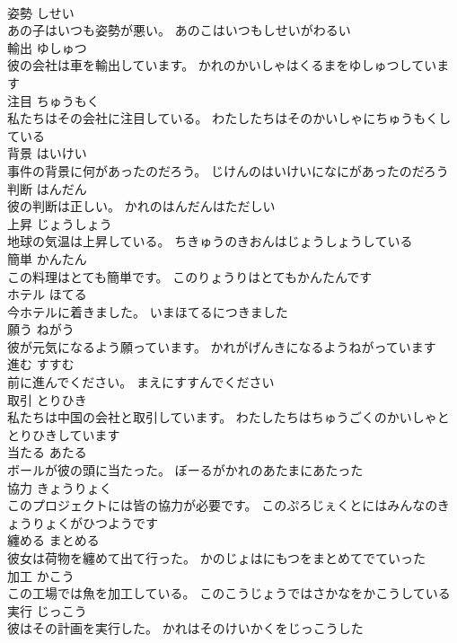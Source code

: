 \documentclass[8pt]{extreport}
\begin{document}
\begin{CJK}{UTF8}{min}
\\	姿勢	しせい	
\\	あの子はいつも姿勢が悪い。	あのこはいつもしせいがわるい	
\\	輸出	ゆしゅつ	
\\	彼の会社は車を輸出しています。	かれのかいしゃはくるまをゆしゅつしています	
\\	注目	ちゅうもく	
\\	私たちはその会社に注目している。	わたしたちはそのかいしゃにちゅうもくしている	
\\	背景	はいけい	
\\	事件の背景に何があったのだろう。	じけんのはいけいになにがあったのだろう	
\\	判断	はんだん	
\\	彼の判断は正しい。	かれのはんだんはただしい	
\\	上昇	じょうしょう	
\\	地球の気温は上昇している。	ちきゅうのきおんはじょうしょうしている	
\\	簡単	かんたん	
\\	この料理はとても簡単です。	このりょうりはとてもかんたんです	
\\	ホテル	ほてる	
\\	今ホテルに着きました。	いまほてるにつきました	
\\	願う	ねがう	
\\	彼が元気になるよう願っています。	かれがげんきになるようねがっています	
\\	進む	すすむ	
\\	前に進んでください。	まえにすすんでください	
\\	取引	とりひき	
\\	私たちは中国の会社と取引しています。	わたしたちはちゅうごくのかいしゃととりひきしています	
\\	当たる	あたる	
\\	ボールが彼の頭に当たった。	ぼーるがかれのあたまにあたった	
\\	協力	きょうりょく	
\\	このプロジェクトには皆の協力が必要です。	このぷろじぇくとにはみんなのきょうりょくがひつようです	
\\	纏める	まとめる	
\\	彼女は荷物を纏めて出て行った。	かのじょはにもつをまとめてでていった	
\\	加工	かこう	
\\	この工場では魚を加工している。	このこうじょうではさかなをかこうしている	
\\	実行	じっこう	
\\	彼はその計画を実行した。	かれはそのけいかくをじっこうした	

\end{CJK}
\end{document}
